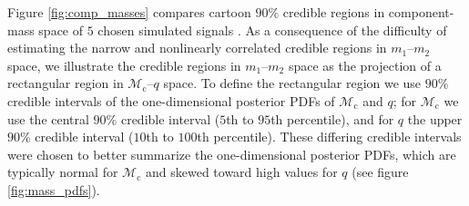 Figure \ref{fig:comp_masses} compares cartoon $90\%$ credible regions in component-mass space of $5$ chosen simulated signals \cite[cf.]{Hannam_2013,Chatziioannou_2014}.  As a consequence of the difficulty of estimating the narrow and nonlinearly correlated credible regions in $m_1$--$m_2$ space, we illustrate the credible regions in $m_1$--$m_2$ space as the projection of a rectangular region in $\mathcal{M}_\mathrm{c}$--$q$ space.  To define the rectangular region we use $90\%$ credible intervals of the one-dimensional posterior PDFs of $\mathcal{M}_\mathrm{c}$ and $q$; for $\mathcal{M}_\mathrm{c}$ we use the central $90\%$ credible interval ($5$th to $95$th percentile), and for $q$ the upper $90\%$ credible interval ($10$th to $100$th percentile).  These differing credible intervals were chosen to better summarize the one-dimensional posterior PDFs, which are typically normal for $\mathcal{M}_\mathrm{c}$ and skewed toward high values for $q$ (see figure \ref{fig:mass_pdfs}).